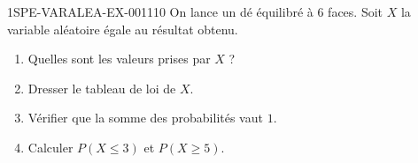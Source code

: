 \begin{exercice}{1SPE-VARALEA-EX-001}{1}{10}
On lance un dé équilibré à $6$ faces. Soit $X$ la variable aléatoire égale au résultat obtenu.

\begin{enumerate}
  \item Quelles sont les valeurs prises par $X$ ?
  \item Dresser le tableau de loi de $X$.
  \item Vérifier que la somme des probabilités vaut $1$.
  \item Calculer $P(X \leq 3)$ et $P(X \geq 5)$.
\end{enumerate}
\end{exercice}
